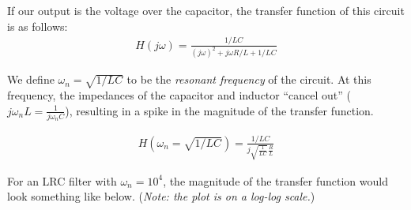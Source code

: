 If our output is the voltage over the capacitor, the transfer function of this circuit is as follows:
\begin{align*}
    H(j\omega) = \frac{1/LC}{(j \omega)^2 + j \omega R/L + 1/LC}
\end{align*}

We define $\omega_n = \sqrt{1/LC}$ to be the \textit{resonant frequency} of the circuit.
At this frequency, the impedances of the capacitor and inductor ``cancel out'' ($j \omega_n L = \frac{1}{j \omega_n C}$), resulting in a spike in the magnitude of the transfer function.

\begin{align*}
    H(\omega_n = \sqrt{1/LC}) = \frac{1/LC}{j\sqrt{\frac{1}{LC}} \frac{R}{L}}
\end{align*}

For an LRC filter with $\omega_n = 10^4$, the magnitude of the transfer function would look something like below. (\textit{Note: the plot is on a log-log scale.}) \\
\begin{center}
\end{center}